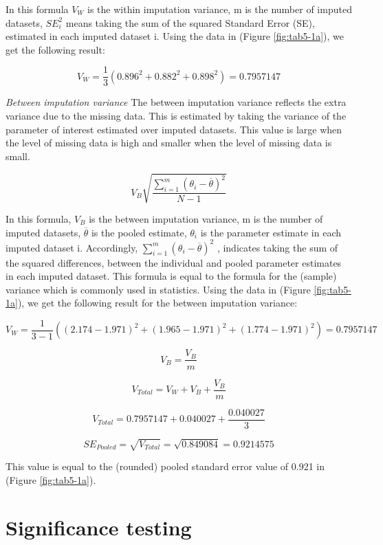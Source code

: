 \documentclass[]{book}
\theoremstyle{definition}
\theoremstyle{definition}
\theoremstyle{definition}
\theoremstyle{remark}
\begin{document}
In this formula \(V_W\) is the within imputation variance, m is the
number of imputed datasets, \(SE_i^2\) means taking the sum of the
squared Standard Error (SE), estimated in each imputed dataset i. Using
the data in (Figure \ref{fig:tab5-1a}), we get the following result:

\[V_W = \frac{1}{3}(0.896^2 + 0.882^2 + 0.898^2)=0.7957147\]

\emph{Between imputation variance} The between imputation variance
reflects the extra variance due to the missing data. This is estimated
by taking the variance of the parameter of interest estimated over
imputed datasets. This value is large when the level of missing data is
high and smaller when the level of missing data is small.

\begin{equation}
V_B\sqrt{\frac{\sum_{i=1}^m (\theta_i - \overline{\theta})^2}{N-1} }
  \label{eq:var-b}
\end{equation}

In this formula, \(V_B\) is the between imputation variance, m is the
number of imputed datasets, \(\overline{\theta}\) is the pooled
estimate, \(\theta_i\) is the parameter estimate in each imputed dataset
i. Accordingly, \({\sum_{i=1}^m(\theta_i - \overline{\theta})^2}\) ,
indicates taking the sum of the squared differences, between the
individual and pooled parameter estimates in each imputed dataset. This
formula is equal to the formula for the (sample) variance which is
commonly used in statistics. Using the data in (Figure
\ref{fig:tab5-1a}), we get the following result for the between
imputation variance:

\[V_W = \frac{1}{3-1}((2.174-1.971)^2+ (1.965-1.971)^2+(1.774-1.971)^2)=0.7957147\]

\[V_B = \frac{V_B}{m}\]

\begin{equation}
V_{Total} = V_W + V_B + \frac{V_B}{m}
  \label{eq:var-t}
\end{equation}

\[V_{Total} = 0.7957147+0.040027 + \frac{0.040027}{3}\]

\[SE_{Pooled} = \sqrt{V_{Total}} = \sqrt{0.849084} = 0.9214575\]

This value is equal to the (rounded) pooled standard error value of
0.921 in (Figure \ref{fig:tab5-1a}).

\section{Significance testing}\label{significance-testing}
\end{document}
